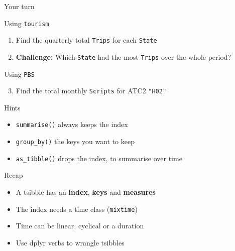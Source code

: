 \documentclass[
  14pt,
  ignorenonframetext,
  aspectratio=169,
]{beamer}
\providecommand{\tightlist}{%
  \setlength{\itemsep}{0pt}\setlength{\parskip}{0pt}}
\begin{document}
\begin{frame}[fragile]{Your turn}
\protect{}\label{your-turn}
\fontsize{12}{13}\sf

\begin{block}{Using \texttt{tourism}}
\protect{}\label{using-tourism}
\begin{enumerate}
\tightlist
\item
  Find the quarterly total \texttt{Trips} for each \texttt{State}
\item
  \textbf{Challenge:} Which \texttt{State} had the most \texttt{Trips}
  over the whole period?
\end{enumerate}
\end{block}

\begin{block}{Using \texttt{PBS}}
\protect{}\label{using-pbs}
\begin{enumerate}
\setcounter{enumi}{2}
\tightlist
\item
  Find the total monthly \texttt{Scripts} for ATC2 \texttt{"H02"}
\end{enumerate}

\pause
\end{block}

\begin{block}{Hints}
\protect{}\label{hints}
\begin{itemize}
\tightlist
\item
  \texttt{summarise()} always keeps the index
\item
  \texttt{group\_by()} the keys you want to keep
\item
  \texttt{as\_tibble()} drops the index, to summarise over time
\end{itemize}
\end{block}
\end{frame}

\begin{frame}[fragile]{Recap}
\protect{}\label{recap}
\begin{itemize}
\tightlist
\item
  A tsibble has an \textbf{index}, \textbf{keys} and \textbf{measures}
\item
  The index needs a time class (\texttt{mixtime})
\item
  Time can be linear, cyclical or a duration
\item
  Use dplyr verbs to wrangle tsibbles
\end{itemize}
\end{frame}
\end{document}

